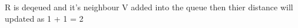 \documentclass[preview]{standalone}
\begin{document}
\begin{center}
R is deqeued and it's neighbour V added into the queue then thier distance will updated as 1 + 1 = 2
\end{center}
\end{document}
